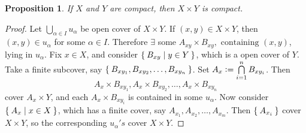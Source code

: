 \documentclass[12pt]{amsart}
\theoremstyle{plain}
\newtheorem*{prop}{Proposition}
\theoremstyle{remark}
\theoremstyle{definition}
\begin{document}
\newpage
\begin{prop}
If $X$ and $Y$ are compact, then $X \times Y$ is compact.
\end{prop}
\begin{proof}
Let $\bigcup\limits_{\alpha \in I} u_{\alpha}$ be open cover of $X  \times Y $.
\newline
If $(x, y) \in X \times Y$, then $(x, y) \in u_{\alpha}$ for some $\alpha \in I$. Therefore $\exists$ some $A_{xy} \times B_{xy}, \mbox{ containing } (x,y)$, lying in $u_{\alpha}$. 
\newline
Fix $x\in X$, and consider $\Set{B_{xy}|y \in Y}$, which is a open cover of $Y$.
Take a finite subcover, say $\Set{B_{xy_1},B_{xy_2}, \dots, B_{xy_n}}$.
\newline
Set $A_x \vcentcolon = \bigcap\limits_{i=1}^{n}B_{xy_i}$. Then 
\begin{equation*}
A_x \times B_{xy_1},A_x \times B_{xy_2},\dots,A_x \times B_{xy_n}
\end{equation*}
cover $A_x \times Y$, and each $A_x \times B_{xy_i}$ is contained in some $u_{\alpha}$.
\newline
Now consider $\Set{A_x|x\in X}$, which has a finite cover, say $A_{x_1},A_{x_2}, \dots, A_{x_m}$. Then $\Set{A_{x_i}}$ cover $X \times Y$, so the corresponding $u_{\alpha} 's$ cover $X \times Y$.
\end{proof}
\end{document}
